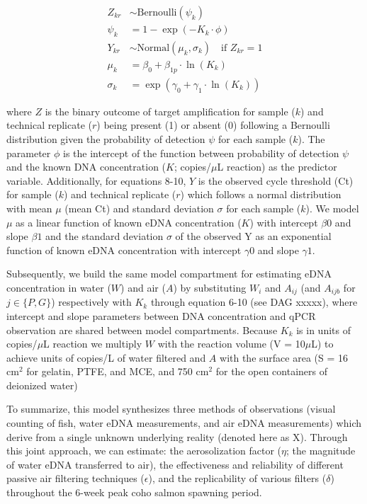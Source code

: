 \documentclass{article}
\begin{document}
\begin{align}
    Z_{kr} &\sim \mathrm{Bernoulli} \left(\psi_{k}\right)  \\
    \psi_{k} &= 1 - \exp(-K_{k} \cdot \phi) \\
    Y_{kr} &\sim \mathrm{Normal} (\mu_{k}, \sigma_{k}) \quad \text{if } Z_{kr} = 1 \\
    \mu_{k} &= \beta_0 + \beta_{1p} \cdot \ln (K_{k}) \\
    \sigma_{k} &= \exp(\gamma_0 + \gamma_1 \cdot \ln (K_{k}))
\end{align}

where $Z$ is the binary outcome of target amplification for sample ($k$) and technical replicate ($r$) being present (1) or absent (0) following a Bernoulli distribution given the probability of detection $\psi$ for each sample ($k$). The parameter $\phi$ is the intercept of the function between probability of detection $\psi$ and the known DNA concentration ($K$; copies/$\mu$L reaction) as the predictor variable. Additionally, for equations 8-10, $Y$ is the observed cycle threshold (Ct) for sample ($k$) and technical replicate ($r$) which follows a normal distribution with mean $\mu$ (mean Ct) and standard deviation $\sigma$ for each sample ($k$). We model $\mu$ as a linear function of known eDNA concentration ($K$) with intercept $\beta0$ and slope $\beta1$ and the standard deviation $\sigma$ of the observed Y as an exponential function of known eDNA concentration with intercept $\gamma0$ and slope $\gamma1$.

Subsequently, we build the same model compartment for estimating eDNA concentration in water ($W$) and air ($A$) by substituting $W_i$ and $A_{ij}$ (and $A_{ijb}$ for $j \in \{P,G\}$) respectively with $K_k$ through equation 6-10 (see DAG xxxxx), where intercept and slope parameters between DNA concentration and qPCR observation are shared between model compartments. Because $K_k$ is in units of copies/$\mu$L reaction we multiply $W$ with the reaction volume (V = 10$\mu$L) to achieve units of copies/L of water filtered and $A$ with the surface area (S = 16 cm$^2$ for gelatin, PTFE, and MCE, and 750 cm$^2$ for the open containers of deionized water)

To summarize, this model synthesizes three methods of observations (visual counting of fish, water eDNA measurements, and air eDNA measurements) which derive from a single unknown underlying reality (denoted here as X). Through this joint approach, we can estimate: the aerosolization factor ($\eta$; the magnitude of water eDNA transferred to air), the effectiveness and reliability of different passive air filtering techniques ($\epsilon$), and the replicability of various filters ($\delta$) throughout the 6-week peak coho salmon spawning period.
\end{document}
